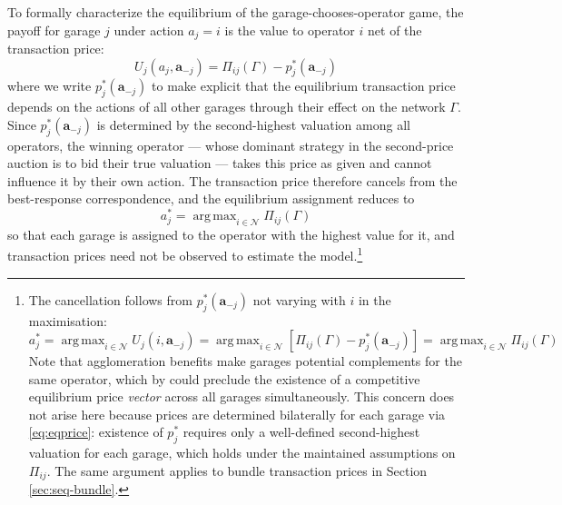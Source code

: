 \documentclass[12pt]{article}
\DeclareMathOperator*{\argmax}{arg\,max}
\begin{document}
To formally characterize the equilibrium of the garage-chooses-operator game, 
the payoff for garage $j$ under action $a_j = i$ is the value to operator $i$ 
net of the transaction price:
\begin{equation}\label{eq:garageutility}
U_{j}(a_{j},\mathbf{a}_{-j}) = \Pi_{ij}(\Gamma) - p_{j}^*(\mathbf{a}_{-j})
\end{equation}
where we write $p_{j}^*(\mathbf{a}_{-j})$ to make explicit that the 
equilibrium transaction price depends on the actions of all other garages 
through their effect on the network $\Gamma$. Since $p_{j}^*(\mathbf{a}_{-j})$ is determined by the second-highest 
valuation among all operators, the winning operator --- whose dominant 
strategy in the second-price auction is to bid their true valuation --- 
takes this price as given and cannot influence it by their own action. 
The transaction price therefore cancels from the best-response 
correspondence, and the equilibrium assignment reduces to 
\begin{equation}\label{eq:garagechoice}
a_{j}^* = \argmax_{i \in \mathcal{N}} \Pi_{ij}(\Gamma)
\end{equation}
so that each garage is assigned to the operator with the highest value 
for it, and transaction prices need not be observed to estimate the 
model.\footnote{The cancellation follows from $p_j^*(\mathbf{a}_{-j})$ 
not varying with $i$ in the maximisation:
\begin{equation}
a_j^* = \argmax_{i \in \mathcal{N}} U_j(i, \mathbf{a}_{-j}) 
= \argmax_{i \in \mathcal{N}} \left[\Pi_{ij}(\Gamma) - p_j^*(\mathbf{a}_{-j})\right] 
= \argmax_{i \in \mathcal{N}} \Pi_{ij}(\Gamma)
\end{equation}
Note that agglomeration benefits make garages potential complements for the same operator, which by \citet[Theorem~4]{Milgrom2000} 
could preclude the existence of a competitive equilibrium price \emph{vector} 
across all garages simultaneously. This concern does not arise here because 
prices are determined bilaterally for each garage via \eqref{eq:eqprice}: 
existence of $p_j^*$ requires only a well-defined second-highest valuation 
for each garage, which holds under the maintained assumptions on $\Pi_{ij}$. 
The same argument applies to bundle transaction prices in Section 
\ref{sec:seq-bundle}.}
\end{document}
